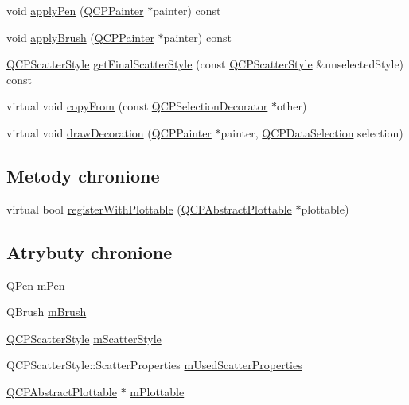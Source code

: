 \begin{DoxyCompactItemize}
void \hyperlink{class_q_c_p_selection_decorator_a9a0e62f544971034fec60e62748768b8}{apply\+Pen} (\hyperlink{class_q_c_p_painter}{Q\+C\+P\+Painter} $\ast$painter) const 
\item 
void \hyperlink{class_q_c_p_selection_decorator_aa7ecaa5c307cc65285cdf62364c69e56}{apply\+Brush} (\hyperlink{class_q_c_p_painter}{Q\+C\+P\+Painter} $\ast$painter) const 
\item 
\hyperlink{class_q_c_p_scatter_style}{Q\+C\+P\+Scatter\+Style} \hyperlink{class_q_c_p_selection_decorator_aa0c630c41103809985f41b3b81b0c308}{get\+Final\+Scatter\+Style} (const \hyperlink{class_q_c_p_scatter_style}{Q\+C\+P\+Scatter\+Style} \&unselected\+Style) const 
\item 
virtual void \hyperlink{class_q_c_p_selection_decorator_a467a8d5cfcab27e862a17c797ac27b8a}{copy\+From} (const \hyperlink{class_q_c_p_selection_decorator}{Q\+C\+P\+Selection\+Decorator} $\ast$other)
\item 
virtual void \hyperlink{class_q_c_p_selection_decorator_a4f8eb49e277063845391e803ae23054a}{draw\+Decoration} (\hyperlink{class_q_c_p_painter}{Q\+C\+P\+Painter} $\ast$painter, \hyperlink{class_q_c_p_data_selection}{Q\+C\+P\+Data\+Selection} selection)
\end{DoxyCompactItemize}
\subsection*{Metody chronione}
\begin{DoxyCompactItemize}
\item 
virtual bool \hyperlink{class_q_c_p_selection_decorator_af66cb39e308da0285ae5d533e1e85027}{register\+With\+Plottable} (\hyperlink{class_q_c_p_abstract_plottable}{Q\+C\+P\+Abstract\+Plottable} $\ast$plottable)
\end{DoxyCompactItemize}
\subsection*{Atrybuty chronione}
\begin{DoxyCompactItemize}
\item 
Q\+Pen \hyperlink{class_q_c_p_selection_decorator_a684a691c146a5bac927c0146bd28d557}{m\+Pen}
\item 
Q\+Brush \hyperlink{class_q_c_p_selection_decorator_a4e3a3a01fdec5b018c0c59a0b6ae9f70}{m\+Brush}
\item 
\hyperlink{class_q_c_p_scatter_style}{Q\+C\+P\+Scatter\+Style} \hyperlink{class_q_c_p_selection_decorator_a5b822197a1bf802c5cf8c3dc43ca549a}{m\+Scatter\+Style}
\item 
Q\+C\+P\+Scatter\+Style\+::\+Scatter\+Properties \hyperlink{class_q_c_p_selection_decorator_acb4f6af085283c9ce7d5c168fb53e855}{m\+Used\+Scatter\+Properties}
\item 
\hyperlink{class_q_c_p_abstract_plottable}{Q\+C\+P\+Abstract\+Plottable} $\ast$ \hyperlink{class_q_c_p_selection_decorator_a25250a1d29b0723c4fa59a97e62f5758}{m\+Plottable}
\end{DoxyCompactItemize}
